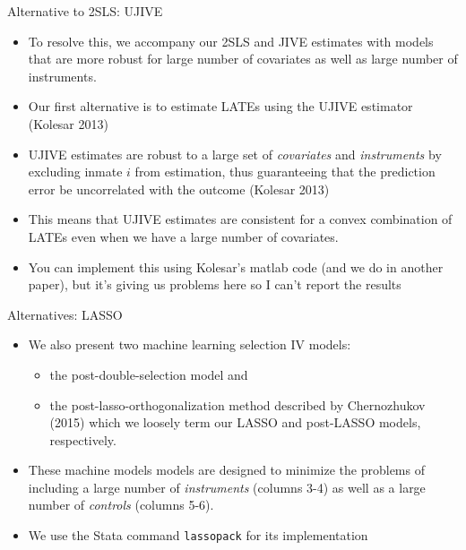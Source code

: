 \documentclass{beamer}
\begin{document}
\begin{frame}{Alternative to 2SLS: UJIVE}

  \begin{itemize}
    \item To resolve this, we accompany our 2SLS and JIVE estimates with models that are more robust for large number of covariates as well as large number of instruments.

    \item Our first alternative is to estimate LATEs using the UJIVE estimator (Kolesar 2013)

    \item UJIVE estimates are robust to a large set of \emph{covariates} and \emph{instruments} by excluding inmate $i$ from estimation, thus guaranteeing that the prediction error be uncorrelated with the outcome (Kolesar 2013)

    \item This means that UJIVE estimates are consistent for a convex combination of LATEs even when we have a large number of covariates.

    \item You can implement this using Kolesar's matlab code (and we do in another paper), but it's giving us problems here so I can't report the results

  \end{itemize}

\end{frame}

\begin{frame}{Alternatives: LASSO}

  \begin{itemize}
    \item We also present two machine learning selection IV models:
          \begin{itemize}
            \item the post-double-selection model and
            \item the post-lasso-orthogonalization method described by Chernozhukov (2015) which we loosely term our LASSO and post-LASSO models, respectively.
          \end{itemize}
    \item These machine models models are designed to minimize the problems of including a large number of \emph{instruments} (columns 3-4) as well as a large number of \emph{controls} (columns 5-6).
    \item We use the Stata command \texttt{lassopack} for its implementation
  \end{itemize}

\end{frame}
\end{document}
